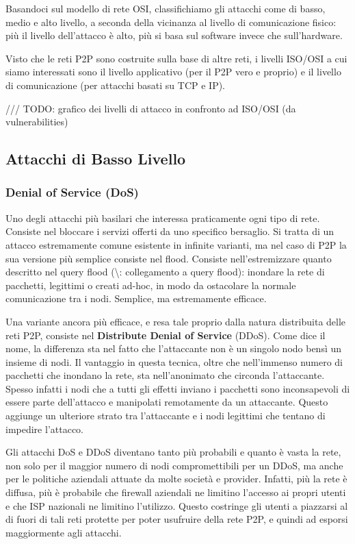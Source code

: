 Basandoci sul modello di rete OSI, classifichiamo gli attacchi come di
basso, medio e alto livello, a seconda della vicinanza al livello di
comunicazione fisico: più il livello dell'attacco è alto, più si basa
sul software invece che sull'hardware.

Visto che le reti P2P sono costruite sulla base di altre reti, i livelli
ISO/OSI a cui siamo interessati sono il livello applicativo (per il P2P
vero e proprio) e il livello di comunicazione (per attacchi basati su
TCP e IP).

/// TODO: grafico dei livelli di attacco in confronto ad ISO/OSI (da
vulnerabilities)

\subsection{Attacchi di Basso Livello}\label{attacchi-di-basso-livello}

\subsubsection{Denial of Service (DoS)}\label{denial-of-service-dos}

Uno degli attacchi più basilari che interessa praticamente ogni tipo di
rete. Consiste nel bloccare i servizi offerti da uno specifico
bersaglio. Si tratta di un attacco estremamente comune esistente in
infinite varianti, ma nel caso di P2P la sua versione più semplice
consiste nel flood. Consiste nell'estremizzare quanto descritto nel
query flood (\textbackslash{}\TODO: collegamento a query flood):
inondare la rete di pacchetti, legittimi o creati ad-hoc, in modo da
ostacolare la normale comunicazione tra i nodi. Semplice, ma
estremamente efficace.

Una variante ancora più efficace, e resa tale proprio dalla natura
distribuita delle reti P2P, consiste nel \textbf{Distribute Denial of
Service} (DDoS). Come dice il nome, la differenza sta nel fatto che
l'attaccante non è un singolo nodo bensì un insieme di nodi. Il
vantaggio in questa tecnica, oltre che nell'immenso numero di pacchetti
che inondano la rete, sta nell'anonimato che circonda l'attaccante.
Spesso infatti i nodi che a tutti gli effetti inviano i pacchetti sono
inconsapevoli di essere parte dell'attacco e manipolati remotamente da
un attaccante. Questo aggiunge un ulteriore strato tra l'attaccante e i
nodi legittimi che tentano di impedire l'attacco.

Gli attacchi DoS e DDoS diventano tanto più probabili e quanto è vasta
la rete, non solo per il maggior numero di nodi compromettibili per un
DDoS, ma anche per le politiche aziendali attuate da molte società e
provider. Infatti, più la rete è diffusa, più è probabile che firewall
aziendali ne limitino l'accesso ai propri utenti e che ISP nazionali ne
limitino l'utilizzo. Questo costringe gli utenti a piazzarsi al di fuori
di tali reti protette per poter usufruire della rete P2P, e quindi ad
esporsi maggiormente agli attacchi.


